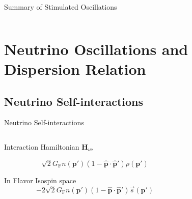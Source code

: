\documentclass[9pt]{beamer}
\begin{document}
\begin{darkframes}
\begin{frame}{Summary of Stimulated Oscillations}
\begin{columns}[T]
\begin{column}{0.4\textwidth}
{}

\end{column}
\end{columns}

\end{frame}







\section{Neutrino Oscillations and Dispersion Relation}

\subsection{Neutrino Self-interactions}

\begin{frame}{Neutrino Self-interactions}


\begin{columns}[T]
   \begin{column}{0.5\textwidth}

      Interaction Hamiltonian $\mathbf H_{\nu\nu}$

      \begin{equation*}
         \sqrt{2}G_{\mathrm F} n(\boldsymbol{ p}') (1- \hat{\boldsymbol{p}} \cdot \hat{\boldsymbol{p}}') \rho( \boldsymbol{p}' )
      \end{equation*}

      In Flavor Isospin space
      \begin{equation*}
         -2\sqrt{2}G_{\mathrm F} n(\boldsymbol{p}') (1- \hat{ \boldsymbol{p} } \cdot \hat{\boldsymbol{p} }')  \vec s ( \boldsymbol{p}' )
      \end{equation*}




   \end{column}

   \begin{column}{0.5\textwidth}


\end{column}
\end{columns}
\end{frame}
\end{darkframes}
\end{document}

